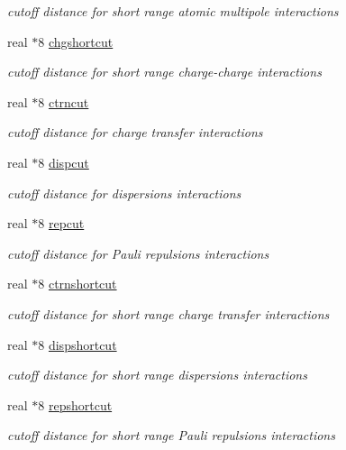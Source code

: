 \begin{DoxyCompactItemize}
\begin{DoxyCompactList}\small\item\em cutoff distance for short range atomic multipole interactions \end{DoxyCompactList}\item 
real $\ast$8 \hyperlink{classcutoff_a405df19c5de05489ea9b130835e7837e}{chgshortcut}
\begin{DoxyCompactList}\small\item\em cutoff distance for short range charge-\/charge interactions \end{DoxyCompactList}\item 
real $\ast$8 \hyperlink{classcutoff_ad5f03f16e01399362bd1106c6780cb71}{ctrncut}
\begin{DoxyCompactList}\small\item\em cutoff distance for charge transfer interactions \end{DoxyCompactList}\item 
real $\ast$8 \hyperlink{classcutoff_a7e03361a39f7572ebf5c29e5ecad9206}{dispcut}
\begin{DoxyCompactList}\small\item\em cutoff distance for dispersions interactions \end{DoxyCompactList}\item 
real $\ast$8 \hyperlink{classcutoff_abf68fbdf5f3b85f07958f7c6aca2f50f}{repcut}
\begin{DoxyCompactList}\small\item\em cutoff distance for Pauli repulsions interactions \end{DoxyCompactList}\item 
real $\ast$8 \hyperlink{classcutoff_a1fbf47f5127967bd55285825743c33f0}{ctrnshortcut}
\begin{DoxyCompactList}\small\item\em cutoff distance for short range charge transfer interactions \end{DoxyCompactList}\item 
real $\ast$8 \hyperlink{classcutoff_a0f4daf222ec1e5bac9d2906f645a802c}{dispshortcut}
\begin{DoxyCompactList}\small\item\em cutoff distance for short range dispersions interactions \end{DoxyCompactList}\item 
real $\ast$8 \hyperlink{classcutoff_a4d74fd4860bdb3b1665921c730e16681}{repshortcut}
\begin{DoxyCompactList}\small\item\em cutoff distance for short range Pauli repulsions interactions \end{DoxyCompactList}\item 

\end{DoxyCompactItemize}
